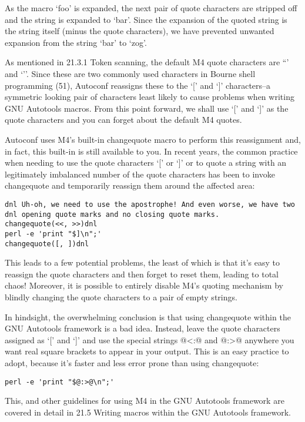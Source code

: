 As the macro `foo' is expanded, the next pair of quote characters are stripped off and the string is expanded to `bar'. Since the expansion of the quoted string is the string itself (minus the quote characters), we have prevented unwanted expansion from the string `bar' to `zog'.

As mentioned in 21.3.1 Token scanning, the default M4 quote characters are ``' and `''. Since these are two commonly used characters in Bourne shell programming (51), Autoconf reassigns these to the `[' and `]' characters--a symmetric looking pair of characters least likely to cause problems when writing GNU Autotools macros. From this point forward, we shall use `[' and `]' as the quote characters and you can forget about the default M4 quotes. 

Autoconf uses M4's built-in changequote macro to perform this reassignment and, in fact, this built-in is still available to you. In recent years, the common practice when needing to use the quote characters `[' or `]' or to quote a string with an legitimately imbalanced number of the quote characters has been to invoke changequote and temporarily reassign them around the affected area:

 	
\begin{verbatim}
dnl Uh-oh, we need to use the apostrophe! And even worse, we have two
dnl opening quote marks and no closing quote marks.
changequote(<<, >>)dnl
perl -e 'print "$]\n";'
changequote([, ])dnl
\end{verbatim}

This leads to a few potential problems, the least of which is that it's easy to reassign the quote characters and then forget to reset them, leading to total chaos! Moreover, it is possible to entirely disable M4's quoting mechanism by blindly changing the quote characters to a pair of empty strings.

In hindsight, the overwhelming conclusion is that using changequote within the GNU Autotools framework is a bad idea. Instead, leave the quote characters assigned as `[' and `]' and use the special strings @<:@ and @:>@ anywhere you want real square brackets to appear in your output. This is an easy practice to adopt, because it's faster and less error prone than using changequote:

 	

\begin{verbatim}
perl -e 'print "$@:>@\n";'
\end{verbatim}

This, and other guidelines for using M4 in the GNU Autotools framework are covered in detail in 21.5 Writing macros within the GNU Autotools framework. 

